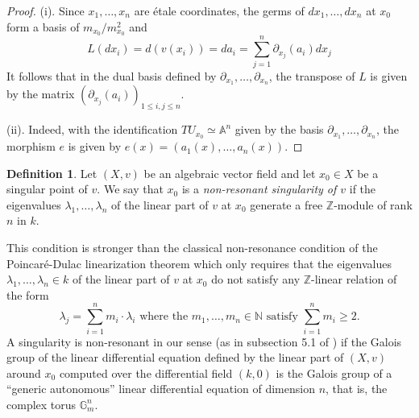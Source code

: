 \documentclass[12pt]{amsart}
\theoremstyle{definition}
\newtheorem{definition}{Definition}[subsection]
\theoremstyle{plain}
\theoremstyle{exampstyle}
\theoremstyle{exampstyle}\newtheorem{thmxbis}{Theorem}
\numberwithin{equation}{section}
\theoremstyle{remark}
\begin{document}
\begin{proof} 
(i). Since $x_1,\ldots, x_n$ are étale coordinates, the germs of $dx_1,\ldots, dx_n$ at $x_0$ form a basis of $m_{x_0}/m_{x_0}^2$ and 
$$L(dx_i) = d (v(x_i)) = da_i = \sum_{ j = 1}^n \partial_{x_j}(a_i)dx_j $$
It follows that in the dual basis defined by $\partial_{x_1}, \ldots, \partial_{x_n}$,  the transpose of $L$ is given by the matrix $(\partial_{x_j}(a_i))_{1 \leq i,j \leq n}$. 

(ii). Indeed, with the identification $TU_{x_0} \simeq \mathbb{A}^n$ given by the basis $\partial_{x_1},\ldots, \partial_{x_n}$, the morphism $e$ is given by $e(x) = (a_1(x),\ldots, a_n(x))$.
\end{proof} 

\begin{definition} 
Let $(X,v)$ be an algebraic vector field and let $x_0 \in X$ be a singular point of $v$. We say that $x_0$ is a {\em non-resonant singularity of $v$} if the eigenvalues $\lambda_1,\ldots, \lambda_n$ of the linear part of $v$ at $x_0$ generate a free $\mathbb{Z}$-module of rank $n$ in $k$. 
\end{definition} 


{\remark This condition is stronger than the classical non-resonance condition of the Poincaré-Dulac linearization theorem which only requires that the eigenvalues $\lambda_1,\ldots, \lambda_n \in k$ of the linear part of $v$ at $x_0$ do not satisfy any $\mathbb{Z}$-linear relation of the form 
$$ \lambda_j = \sum_{i = 1}^n m_i \cdot \lambda_i \text{ where the } m_1,\ldots, m_n \in \mathbb{N} \text{ satisfy } \sum_{i = 1}^n m_i \geq 2. $$ 
A singularity is non-resonant in our sense (as in subsection 5.1 of \cite{Pereira-JEMS}) if the Galois group of the linear differential equation defined by the linear part of $(X,v)$ around $x_0$ computed over the differential field $(k,0)$ is the Galois group of a ``generic autonomous'' linear differential equation of dimension $n$, that is, the complex torus $\mathbb{G}_m^n$.}  
\end{document}
